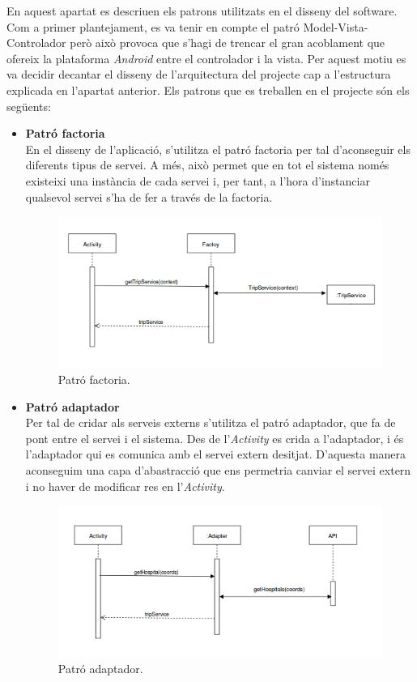 En aquest apartat es descriuen els patrons utilitzats en el disseny del software. Com a primer plantejament, es va tenir en compte el patró Model-Vista-Controlador però això provoca que s'hagi de trencar el gran acoblament que ofereix la plataforma \textit{Android} entre el controlador i la vista. Per aquest motiu es va decidir decantar el disseny de l'arquitectura del projecte cap a l'estructura explicada en l'apartat anterior. Els patrons que es treballen en el projecte són els següents:
\begin{itemize}
\item{\textbf{Patró factoria}}\\
En el disseny de l'aplicació, s'utilitza el patró factoria per tal d'aconseguir els diferents tipus de servei. A més, això permet que en tot el sistema només existeixi una instància de cada servei i, per tant, a l'hora d'instanciar qualsevol servei s'ha de fer a través de la factoria.

\begin{figure}[!h]
\centering
\includegraphics[scale=0.75]{Figures/patroFactoria.png}
\caption{Patró factoria.}
\end{figure}

\item{\textbf{Patró adaptador}}\\
Per tal de cridar als serveis externs s'utilitza el patró adaptador, que fa de pont entre el servei i el sistema. Des de l'\textit{Activity} es crida a l'adaptador, i és l'adaptador qui es comunica amb el servei extern desitjat. D'aquesta manera aconseguim una capa d'abastracció que ens permetria canviar el servei extern i no haver de modificar res en l'\textit{Activity}.

\begin{figure}[!h]
\centering
\includegraphics[scale=0.75]{Figures/patroAdaptador.png}
\caption{Patró adaptador.}
\end{figure}


\end{itemize}
